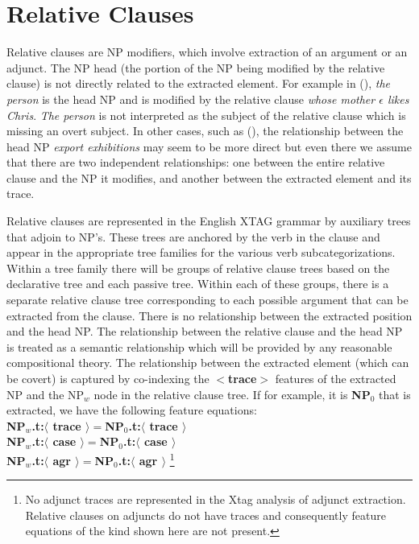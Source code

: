\chapter{Relative Clauses}
\label{rel_clauses}

Relative clauses are NP modifiers, which involve extraction of
an argument or an adjunct. The NP head (the
portion of the NP being modified by the relative clause) is 
not directly related to the extracted element. 
For example in (), {\it the person} is the head NP
and is modified by the relative clause {\it whose mother $\epsilon$ 
likes Chris}. {\em The person} is not interpreted as the subject of the
relative clause which is missing an overt subject. In other cases, such
as (), the relationship between the head NP {\em export exhibitions}
may seem to be more direct but even there we assume that there are two
independent relationships: one between the entire relative clause
and the NP it modifies, and another between the extracted element
and its trace. 


Relative clauses are represented in the English XTAG grammar by auxiliary trees
that adjoin to NP's. These trees are anchored by the verb in the clause and
appear in the appropriate tree families for the various verb
subcategorizations. Within a tree family there will be groups of relative
clause trees based on the declarative tree and each passive tree. Within each
of these groups, there is a separate relative clause tree corresponding to each
possible argument that can be extracted from the clause. There is
no  relationship between the extracted position and the head NP.
The relationship between the relative clause and the head NP is treated
as a semantic relationship which will be provided by any reasonable
compositional theory. The relationship between the extracted element
(which can be covert) is captured by co-indexing the
{\bf $<$trace$>$} features of the extracted NP and the NP$_{w}$ node in the
relative clause tree. If for example, it is {\bf NP$_{0}$} that is extracted,
we have the following feature equations:\\
{\bf NP$_{w}$.t:$\langle$ trace $\rangle =$NP$_{0}$.t:$\langle$ trace $\rangle$}\\
{\bf NP$_{w}$.t:$\langle$ case $\rangle =$NP$_{0}$.t:$\langle$ case $\rangle$}\\
{\bf NP$_{w}$.t:$\langle$ agr $\rangle =$NP$_{0}$.t:$\langle$ agr $\rangle$}
\footnote{
No adjunct traces are represented in the Xtag analysis of adjunct extraction.
Relative clauses on adjuncts do not have traces and consequently feature
equations of the kind shown here are not present.}

